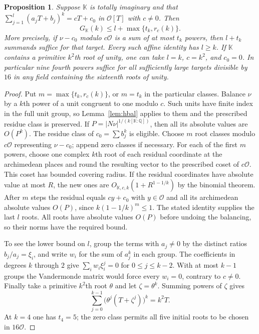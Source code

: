 \documentclass[11pt,letterpaper]{article}
\newtheorem{proposition}[proposition]{Proposition}
\theoremstyle{definition}
\numberwithin{equation}{section}
\begin{document}
\begin{proposition}\label{prop:complex-linear-identity}
Suppose $\mathbb K$ is totally imaginary and that
$\sum_{j=1}^l(a_jT+b_j)^k=cT+c_0$ in $\mathcal O[T]$ with $c\ne0$.
Then
\[
       G_{\mathbb K}(k)\le l+\max\{t_k,r_c(k)\}.
\]
More precisely, if $\nu-c_0$ modulo $c\mathcal O$ is a sum of at
most $t_k$ powers, then $l+t_k$ summands suffice for that target.
Every such affine identity has $l\ge k$. If $\mathbb K$ contains
a primitive $k^2$th root of unity, one can take $l=k$, $c=k^2$, and
$c_0=0$. In particular nine fourth powers suffice for all sufficiently
large targets divisible by $16$ in any field containing the sixteenth
roots of unity.
\end{proposition}
\begin{proof}
Put $m=\max\{t_k,r_c(k)\}$, or $m=t_k$ in the particular classes.
Balance $\nu$ by a $k$th power of a unit congruent to one modulo $c$. Such units have finite index in the full unit group, so Lemma~\ref{lem:hbal} applies to them and the prescribed residue class is preserved. If
$P=|N\nu|^{1/(k[\mathbb K:\mathbb Q])}$, then all its absolute values
are $O(P^k)$. The residue class of $c_0=\sum b_j^k$ is eligible.
Choose $m$ root classes modulo $c\mathcal O$ representing $\nu-c_0$;
append zero classes if necessary. For each of the first $m$ powers,
choose one complex $k$th root of each residual coordinate at the
archimedean places and round the resulting vector to the prescribed
coset of $c\mathcal O$. This coset has bounded covering radius.
If the residual coordinates have absolute value at most $R$, the new
ones are $O_{\mathbb K,c,k}(1+R^{1-1/k})$ by the binomial theorem.
After $m$ steps the residual equals $cy+c_0$ with $y\in\mathcal O$
and all its archimedean absolute values $O(P)$, since
$k(1-1/k)^m\le1$. The stated identity supplies the last $l$ roots.
All roots have absolute values $O(P)$ before undoing the balancing,
so their norms have the required bound.

To see the lower bound on $l$, group the terms with $a_j\ne0$ by
the distinct ratios $b_j/a_j=\xi_i$, and write $w_i$ for the sum
of $a_j^k$ in each group. The coefficients in degrees $k$ through
$2$ give $\sum_i w_i\xi_i^j=0$ for $0\le j\le k-2$. With at most
$k-1$ groups the Vandermonde matrix would force every $w_i=0$,
contrary to $c\ne0$. Finally take a primitive $k^2$th root $\theta$
and let $\zeta=\theta^k$. Summing powers of $\zeta$ gives
\[
     \sum_{j=0}^{k-1}\bigl(\theta^j(T+\zeta^j)\bigr)^k=k^2T.
\]
At $k=4$ one has $t_4=5$; the zero class permits all five initial
roots to be chosen in $16\mathcal O$.
\end{proof}
\end{document}
